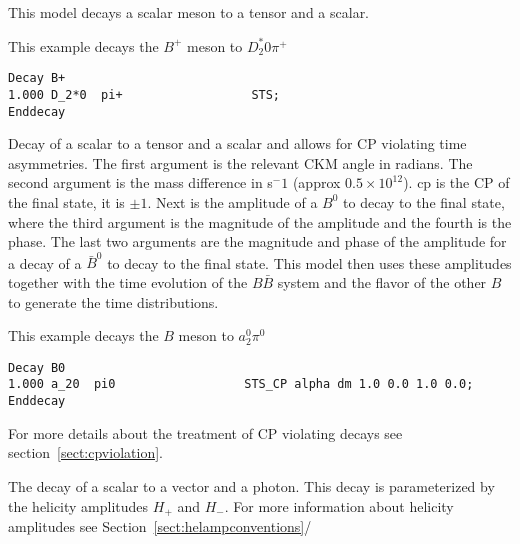 
\label{sts}



\Expl
This model decays a scalar meson to a tensor and a scalar.

\Example
This example decays the $B^+$ meson to $D_2^*0\pi^+$
\begin{verbatim}
Decay B+
1.000 D_2*0  pi+                  STS;
Enddecay
\end{verbatim}





\label{stscp}



\Expl
Decay of a scalar to a tensor and a scalar and allows for CP violating 
time asymmetries. The first argument is the relevant CKM
angle in radians. The second argument is the mass difference
in s$^-1$ (approx $0.5\times 10^{12}$).
cp is the CP of the final state, it is $\pm 1$. 
Next is the amplitude 
of a $B^0$ to decay to the final state, where the third argument is the 
magnitude of the amplitude and the fourth is the phase. The
last two arguments are the magnitude and phase of the
amplitude for a decay of a $\bar B^0$ to decay to the 
final state. This model then uses these amplitudes 
together with the time evolution of the
$B\bar B$ system and the flavor of the other
$B$ to generate the time distributions.

\Example
This example decays the $B$ meson to $a_2^0\pi^0$
\begin{verbatim}
Decay B0
1.000 a_20  pi0                  STS_CP alpha dm 1.0 0.0 1.0 0.0;
Enddecay
\end{verbatim}

\Notes
For more details about the treatment of CP violating decays 
see section~\ref{sect:cpviolation}.





\label{svphelamp}



\Expl
The decay of a scalar to a vector and a photon. This decay is
parameterized by the helicity amplitudes $H_+$ and $H_-$.
For more information about helicity amplitudes see 
Section~\ref{sect:helampconventions}/

